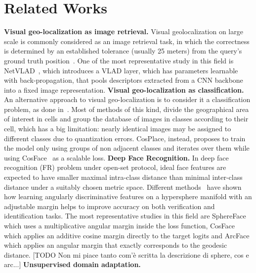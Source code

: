 \documentclass[10pt,twocolumn,letterpaper]{article}
\begin{document}
\section{Related Works}\label{sec:relatedworks}
\textbf{Visual geo-localization as image retrieval.} Visual geolocalization on large scale is commonly considered as an image retrieval task, in which the correctness is determined by an established
tolerance (usually 25 meters) from the query's ground truth position~\cite{netvlad, adageo}.    
One of the most representative study in this field is NetVLAD~\cite{netvlad}, which introduces a VLAD layer, which has parameters learnable with back-propagation, that pools descriptors extracted from a CNN backbone into a fixed image representation.
\newline
\textbf{Visual geo-localization as classification.}
An alternative approach to visual geo-localization is to consider it a classification problem, as done in~\cite{Berton_CVPR_2022_CosPlace}. Most of methods of this kind, divide the geographical area of interest in cells and group the database of images in classes according to their cell, which has a big limitation: nearly identical images may be assigned to different classes due to quantization errors.
CosPlace, instead, proposes to train the model only using groups of non adjacent classes and iterates over them while using CosFace~\cite{cosface} as a scalable loss.
\newline
\textbf{Deep Face Recognition.}
In deep face recognition (FR) problem under open-set protocol, ideal face features are expected to have smaller maximal intra-class distance than minimal inter-class distance under a suitably chosen metric space. Different methods~\cite{sphereface, cosface, arcface} have shown how learning angularly discriminative features on a hypersphere manifold with an adjustable margin helps to improve accuracy on both verification and identification tasks. The most representative studies in this field are SphereFace~\cite{sphereface} which uses a multiplicative angular margin inside the loss function, CosFace~\cite{cosface} which applies an additive cosine margin directly to the target logits and ArcFace~\cite{arcface} which applies an angular margin that exactly corresponds to the geodesic distance. [TODO Non mi piace tanto com'è scritta la descrizione di sphere, cos e arc...]
\newline
\textbf{Unsupervised domain adaptation.}
\end{document}
